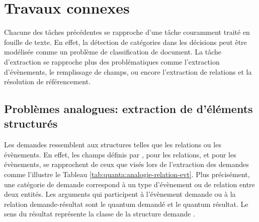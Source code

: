  
\section{Travaux connexes}
\label{sec:quanta:biblio}
Chacune des tâches précédentes se rapproche d'une tâche couramment traité en fouille de texte. En effet, la détection de catégories dans les décisions peut être modélisée comme un problème de classification de document. La tâche d'extraction se rapproche plus des problématiques  comme l'extraction d'évènements, le remplissage de champs, ou encore l'extraction de relations et la résolution de référencement.

\subsection{Problèmes analogues: extraction de d'éléments structurés}%

Les demandes ressemblent aux structures telles que les relations ou les évènements. En effet, les champs définis par \citet{ace2005relation}, pour les relations, et \citet{ace2005event} pour les évènements, se rapprochent de ceux que visés lors de l'extraction des demandes comme l'illustre le Tableau \ref{tab:quanta:analogie-relation-evt}. Plus précisément, une catégorie de demande correspond à un type d'évènement ou de relation entre deux entités. Les arguments qui participent à l'évènement \og demande \fg{} ou à la relation \og demande-résultat \fg{} sont le quantum demandé et le quantum résultat. Le sens du résultat représente la classe de la structure \og demande \fg{}.

